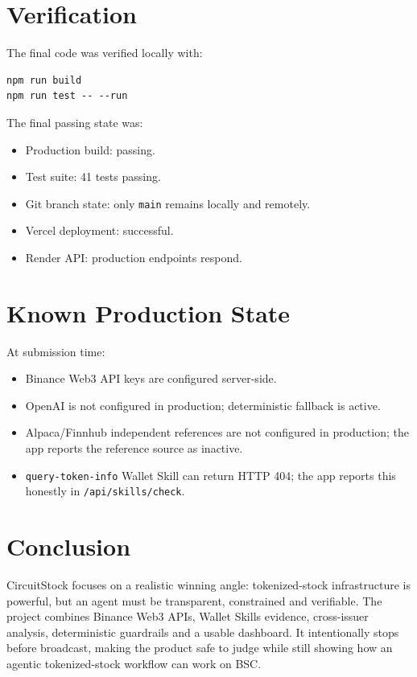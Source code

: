 \documentclass[11pt,a4paper]{article}
\begin{document}
\section{Verification}

The final code was verified locally with:

\begin{verbatim}
npm run build
npm run test -- --run
\end{verbatim}

The final passing state was:

\begin{itemize}
  \item Production build: passing.
  \item Test suite: 41 tests passing.
  \item Git branch state: only \texttt{main} remains locally and remotely.
  \item Vercel deployment: successful.
  \item Render API: production endpoints respond.
\end{itemize}

\section{Known Production State}

At submission time:

\begin{itemize}
  \item Binance Web3 API keys are configured server-side.
  \item OpenAI is not configured in production; deterministic fallback is active.
  \item Alpaca/Finnhub independent references are not configured in production; the app reports the reference source as inactive.
  \item \texttt{query-token-info} Wallet Skill can return HTTP 404; the app reports this honestly in \texttt{/api/skills/check}.
\end{itemize}

\section{Conclusion}

CircuitStock focuses on a realistic winning angle: tokenized-stock infrastructure is powerful, but an agent must be transparent, constrained and verifiable. The project combines Binance Web3 APIs, Wallet Skills evidence, cross-issuer analysis, deterministic guardrails and a usable dashboard. It intentionally stops before broadcast, making the product safe to judge while still showing how an agentic tokenized-stock workflow can work on BSC.
\end{document}
